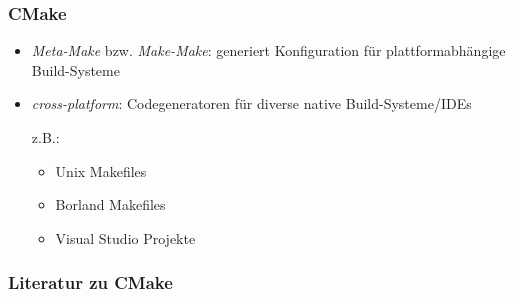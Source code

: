 \begin{frame}
	\frametitle{CMake}
	\begin{itemize}
		\pause
		\item \emph{Meta-Make} bzw. \emph{Make-Make}: generiert Konfiguration für plattformabhängige Build-Systeme
		\pause
		\item \emph{cross-platform}: Codegeneratoren für diverse native Build-Systeme/IDEs

			z.B.:
			\begin{itemize}
				\item Unix Makefiles
				\item Borland Makefiles
				\item Visual Studio Projekte
			\end{itemize}
	\end{itemize}
\end{frame}

\begin{frame}
	\frametitle{Literatur zu CMake}
\end{frame}

